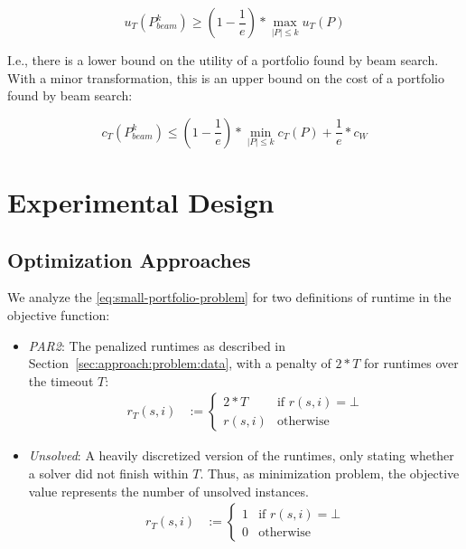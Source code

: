 \documentclass[conference]{IEEEtran}
\begin{document}
\begin{equation}
	u_{T}(P_{beam}^k) \geq (1 - \frac{1}{e}) * \max_{|P| \leq k}{u_{T}(P)}
\end{equation}

I.e., there is a lower bound on the utility of a portfolio found by beam search.
With a minor transformation, this is an upper bound on the cost of a portfolio found by beam search:

\begin{equation}
	c_{T}(P_{beam}^k) \leq (1 - \frac{1}{e}) * \min_{|P| \leq k}{c_{T}(P)} + \frac{1}{e} * c_W
	\label{eq:upper-bound}
\end{equation}

\section{Experimental Design}
\label{sec:experimental-design}

\subsection{Optimization Approaches}

We analyze the \ref{eq:small-portfolio-problem} for two definitions of runtime in the objective function:

\begin{itemize}
	\item \emph{PAR2}:
	The penalized runtimes as described in Section~\ref{sec:approach:problem:data}, with a penalty of $2*T$ for runtimes over the timeout $T$:
	\begin{align*}
		r_T(s,i) &:= \begin{cases}
			2*T & \text{if }r(s,i) = \bot\\
			r(s,i) & \text{otherwise}
		\end{cases}
	\end{align*}
	\item \emph{Unsolved}:
	A heavily discretized version of the runtimes, only stating whether a solver did not finish within $T$.
	Thus, as minimization problem, the objective value represents the number of unsolved instances.
	\begin{align*}
		r_T(s,i) &:= \begin{cases}
			1 & \text{if }r(s,i) = \bot\\
			0 & \text{otherwise}
		\end{cases}
	\end{align*}
\end{itemize}
\end{document}
